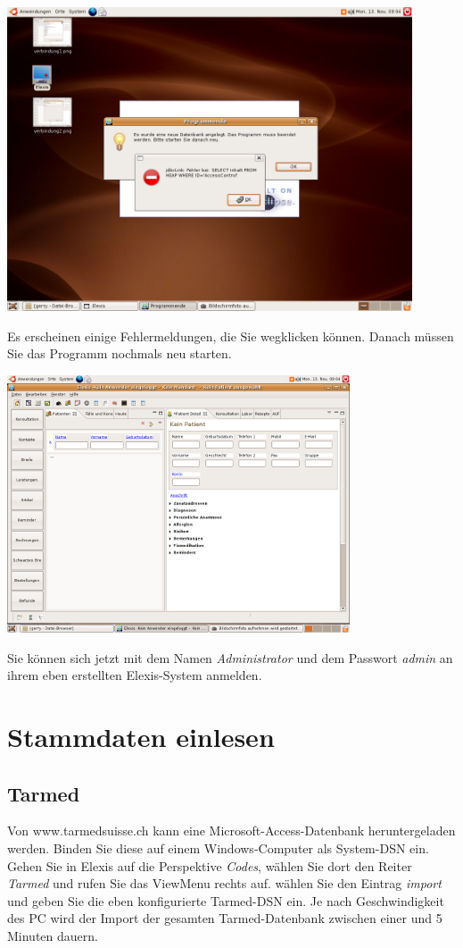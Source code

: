 \includegraphics[width=0.9\textwidth]{images/verbindung13.png}

 Es erscheinen einige Fehlermeldungen, die Sie wegklicken können. Danach müssen Sie das Programm nochmals neu starten.

\includegraphics[width=4in]{images/verbindung14.png}

Sie können sich jetzt mit dem Namen \textit{Administrator} und dem Passwort \textit{admin} an ihrem eben erstellten Elexis-System anmelden.

\section{Stammdaten einlesen}
\subsection{Tarmed}
Von www.tarmedsuisse.ch kann eine Microsoft-Access-Datenbank heruntergeladen werden. Binden Sie diese auf einem Windows-Computer als System-DSN ein. Gehen Sie in Elexis auf die Perspektive \textit{Codes}, wählen Sie dort den Reiter \textit{Tarmed} und rufen Sie das ViewMenu rechts auf. wählen Sie den Eintrag \textit{import} und geben Sie die eben konfigurierte Tarmed-DSN ein. Je nach Geschwindigkeit des PC wird der Import der gesamten Tarmed-Datenbank zwischen einer und 5 Minuten dauern.
